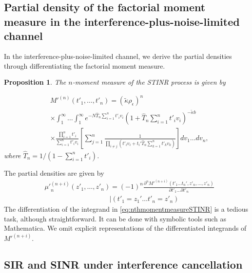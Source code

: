 \documentclass[lettersize,journal]{IEEEtran}
\newtheorem{prop}[theorem]{Proposition}
\begin{document}
\subsection{Partial density of the factorial moment measure in the interference-plus-noise-limited channel}


In the interference-plus-noise-limited channel, we derive the partial densities through differentiating the factorial moment measure.

\begin{prop}
  The $n$-moment measure of the STINR process is given by

  \begin{align}
    \label{eq:nthmomentmeasureSTINR}
      &M'^{(n)}(t'_1,\dots,t'_n) =\left(\tilde{\kappa} \rho_{\epsilon}\right)^n \nonumber\\
      &\times \int_1^{\infty}\dots\int_1^{\infty} e^{-N\hat{T}_n\sum\limits_{i=1}^nt'_iv_i} \left(1+\hat{T}_n\sum\limits_{i=1}^nt'_iv_i\right)^{-\tilde{\kappa}b} \nonumber\\
      &\times \frac{\prod\limits_{i=1}^nt'_i}{\sum\limits_{i=1}^nt'_iv_i}  \left[\sum\limits_{j=1}^n\frac{1}{\prod\limits_{i\neq j}\left(t'_i v_i+ t_i'\hat{T}_n\sum\limits_{k=1}^nt'_kv_k \right)} \right] dv_1 \dots dv_n,
    \end{align}
    where $\hat{T}_n= 1/(1-\sum_{i=1}^nt'_i)$.


\end{prop}
 
The partial densities are given by
    \begin{align}
      \label{eq:differatemomentmeasure}
     &{\mu'}_n^{(n+i)}(z'_1,\dots,z'_n)= (-1)^n \frac{\partial^n M'^{(n+i)}(t'_1\dots t_n', z'_n, \dots, z'_n)}{\partial t'_1 \dots \partial t'_n} \nonumber\\
      &\hspace{4cm}|(t'_1=z_1'\dots t'_n=z'_n)
    \end{align}
The differentiation of the integrand in \eqref{eq:nthmomentmeasureSTINR} is a tedious task, although straightforward. It can be done with symbolic tools such as Mathematica. We omit explicit representations of the differentiated integrands of $M'^{(n+i)}$.



\subsection{SIR and SINR under interference cancellation}
\end{document}
